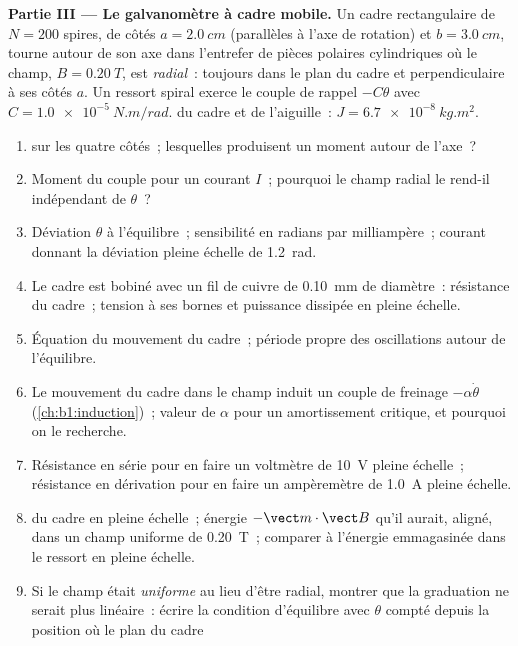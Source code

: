 \begin{problem}
\medskip
\noindent\textbf{Partie III --- Le galvanomètre à cadre mobile.}
Un cadre rectangulaire de $N = 200$ spires, de côtés $a = \qty{2.0}{cm}$
(parallèles à l'axe de rotation) et $b = \qty{3.0}{cm}$, tourne autour de son
axe dans l'entrefer de pièces polaires cylindriques où le champ,
$B = \qty{0.20}{T}$, est \emph{radial}~: toujours dans le plan du cadre et
perpendiculaire à ses côtés $a$. Un ressort spiral exerce le couple de rappel
$-C\theta$ avec $C = \qty{1.0e-5}{N.m/rad}$.  du cadre et de
l'aiguille~: $J = \qty{6.7e-8}{kg.m^2}$.
\begin{enumerate}[resume]
  \item {} sur les quatre côtés~; lesquelles produisent un
        moment autour de l'axe~?
  \item Moment du couple pour un courant $I$~; pourquoi le champ radial le
        rend-il indépendant de $\theta$~?
  \item Déviation $\theta$ à l'équilibre~; sensibilité en radians par
        milliampère~; courant donnant la déviation pleine échelle de \qty{1.2}{rad}.
  \item Le cadre est bobiné avec un fil de cuivre de \qty{0.10}{mm} de
        diamètre~: résistance du cadre~; tension à ses bornes et puissance
        dissipée en pleine échelle.
  \item Équation du mouvement du cadre~; période propre des oscillations
        autour de l'équilibre.
  \item Le mouvement du cadre dans le champ induit un couple de freinage
        $-\alpha\dot\theta$ (\cref{ch:b1:induction})~; valeur de $\alpha$ pour
        un amortissement critique, et pourquoi on le recherche.
  \item Résistance en série pour en faire un voltmètre de \qty{10}{V} pleine
        échelle~; résistance en dérivation pour en faire un ampèremètre de
        \qty{1.0}{A} pleine échelle.
  \item {} du cadre en pleine échelle~; énergie $-\vect m\cdot
        \vect B$ qu'il aurait, aligné, dans un champ uniforme de \qty{0.20}{T}~;
        comparer à l'énergie emmagasinée dans le ressort en pleine échelle.
  \item Si le champ était \emph{uniforme} au lieu d'être radial, montrer que
        la graduation ne serait plus linéaire~: écrire la condition d'équilibre
        avec $\theta$ compté depuis la position où le plan du cadre

\end{enumerate}
\end{problem}

